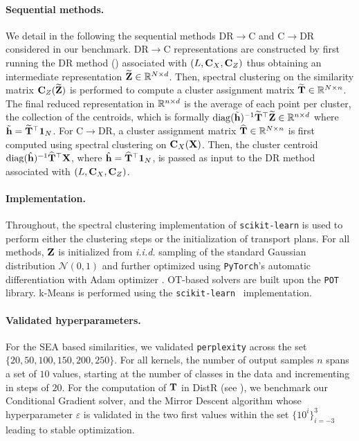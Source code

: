 \paragraph{Sequential methods.} We detail in the following the sequential methods DR$\to$C and C$\to$DR considered in our benchmark. DR$\to$C representations are constructed by first running the DR method () associated with $(L, {\mathbf{C}}_X, {\mathbf{C}}_Z)$ thus obtaining an intermediate representation $\widetilde{{\mathbf{Z}}} \in \mathbb{R}^{N \times d}$. Then, spectral clustering \cite{von2007tutorial} on the similarity matrix ${\mathbf{C}}_Z(\widetilde{{\mathbf{Z}}})$ is performed to compute a cluster assignment matrix $\widetilde{{\mathbf{T}}} \in \mathbb{R}^{N \times n}$. The final reduced representation in $\mathbb{R}^{n \times d}$ is the average of each point per cluster, \ie the collection of the centroids, which is formally $\operatorname{diag}(\tilde{{\mathbf{h}}})^{-1} \widetilde{{\mathbf{T}}}^\top \widetilde{{\mathbf{Z}}} \in \mathbb{R}^{n \times d}$ where $\tilde{{\mathbf{h}}} = \widetilde{{\mathbf{T}}}^\top \bm{1}_N$.
For C$\to$DR, a cluster assignment matrix $\widehat{{\mathbf{T}}} \in \mathbb{R}^{N \times n}$ is first computed using spectral clustering on ${\mathbf{C}}_X({\mathbf{X}})$.
Then, the cluster centroid $\operatorname{diag}(\hat{{\mathbf{h}}})^{-1} \widehat{{\mathbf{T}}}^\top {\mathbf{X}}$, where $\hat{{\mathbf{h}}} = \widehat{{\mathbf{T}}}^\top \bm{1}_N$, is passed as input to the DR method associated with $(L, {\mathbf{C}}_X, {\mathbf{C}}_Z)$.

\paragraph{Implementation.} 
Throughout, the spectral clustering implementation of \texttt{scikit-learn} \cite{pedregosa2011scikit} is used to perform either the clustering steps or the initialization of transport plans. 
For all methods, ${\mathbf{Z}}$ is initialized from \emph{i.i.d.} sampling of the standard Gaussian distribution $\mathcal{N}(0,1)$ and further optimized using \texttt{PyTorch}'s automatic differentiation \cite{paszke2017automatic} with Adam optimizer \cite{kingma2014adam}. OT-based solvers are built upon the \texttt{POT} \cite{flamary2021pot} library.
k-Means is performed using the \texttt{scikit-learn}~\cite{pedregosa2011scikit} implementation.

\paragraph{Validated hyperparameters.} For the SEA based similarities, we validated \texttt{perplexity} across the set $\{20, 50, 100, 150, 200, 250\}$. For all kernels, the number of output samples $n$ spans a set of $10$ values, starting at the number of classes in the data and incrementing in steps of $20$. For the computation of ${\mathbf{T}}$ in DistR (see ), we benchmark our Conditional Gradient solver, and the Mirror Descent algorithm whose hyperparameter $\varepsilon$ is validated in the two first values within the set $\{10^{i}\}_{i=-3}^3$ leading to stable optimization.

